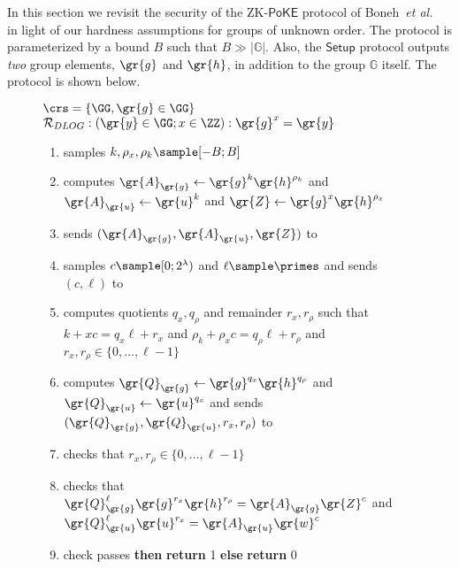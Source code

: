 In this section we revisit the security of the ZK-$\mathsf{PoKE}$ protocol of Boneh~\emph{et al.}~\cite{C:BBF19} in light of our hardness assumptions for groups of unknown order. The protocol is parameterized by a bound $B$ such that $B \gg |\mathbb{G}|$. Also, the $\mathsf{Setup}$ protocol outputs \emph{two} group elements, $\gr{g}$ and $\gr{h}$, in addition to the group $\mathbb{G}$ itself. The protocol is shown below.

\begin{figure}[!htp]
\noindent\begin{mdframed}[userdefinedwidth=\textwidth]
\begin{minipage}{\textwidth}
	\begin{flushleft}
	$\crs=\{\GG,\gr{g}\in \GG\}$\\
	$\mathcal{R}_{DLOG}: (\gr{y} \in \GG;x \in \ZZ): \gr{g}^x=\gr{y}$
	\begin{enumerate}[nolistsep]
			\item \prover samples $k, \rho_x, \rho_k \sample [-B; B]$
			\item \prover computes $\gr{A}_\gr{g} \gets \gr{g}^k\gr{h}^{\rho_k}$ and $\gr{A}_\gr{u} \gets \gr{u}^k$ and $\gr{Z} \gets \gr{g}^x \gr{h}^{\rho_x}$
			\item \prover sends $(\gr{A}_\gr{g}, \gr{A}_\gr{u}, \gr{Z})$ to \verifier
		    \item \verifier samples $c \sample [0; 2^\lambda)$ and $\ell \sample \primes$ and sends $(c, \ell)$ to \prover
		    \item \prover computes quotients $q_x, q_\rho$ and remainder $r_x, r_\rho$ such that $k+xc = q_x\ell + r_x$ and $\rho_k + \rho_x{}c = q_\rho \ell + r_\rho$ and $r_x, r_\rho \in \{0, \ldots, \ell-1\}$
		    \item \prover computes $\gr{Q}_\gr{g} \gets \gr{g}^{q_x}\gr{h}^{q_\rho}$ and $\gr{Q}_\gr{u} \gets \gr{u}^{q_x}$ and sends $(\gr{Q}_\gr{g}, \gr{Q}_\gr{u}, r_x, r_\rho)$ to \verifier
		    \item \verifier checks that $r_x, r_\rho \in \{0, \ldots, \ell-1\}$
		    \item \verifier checks that $\gr{Q}_\gr{g}^\ell\gr{g}^{r_x}\gr{h}^{r_\rho} = \gr{A}_\gr{g}\gr{Z}^c$ and $\gr{Q}_\gr{u}^\ell \gr{u}^{r_x} = \gr{A}_\gr{u} \gr{w}^c$
		    \item \pcif{}check passes \textbf{then} \textbf{return} 1 \textbf{else} \textbf{return} 0
		\end{enumerate}
	\end{flushleft}
\end{minipage}
\end{mdframed}
\end{figure}

